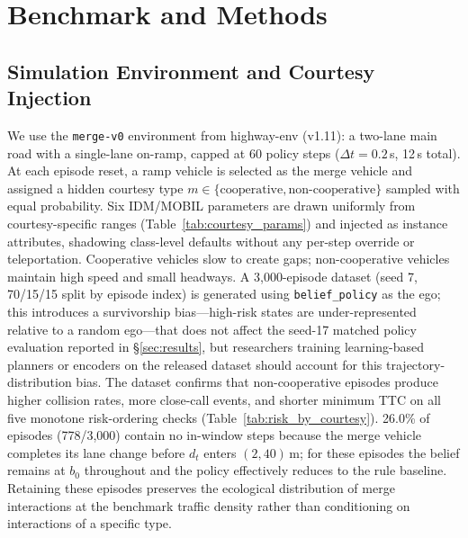 \section{Benchmark and Methods}
\label{sec:benchmark}

\subsection{Simulation Environment and Courtesy Injection}
We use the \texttt{merge-v0} environment from highway-env
\citep{leurent_highway_env} (v1.11): a two-lane main road with a single-lane
on-ramp, capped at 60 policy steps ($\Delta t{=}0.2$\,s, 12\,s total).
At each episode reset, a ramp vehicle is selected as the merge vehicle and
assigned a hidden courtesy type $m \in \{\text{cooperative},
\text{non-cooperative}\}$ sampled with equal probability.
Six IDM/MOBIL parameters are drawn uniformly from courtesy-specific ranges
(Table~\ref{tab:courtesy_params}) and injected as instance attributes,
shadowing class-level defaults without any per-step override or teleportation.
Cooperative vehicles slow to create gaps; non-cooperative vehicles maintain
high speed and small headways.
A 3{,}000-episode dataset (seed 7, 70/15/15 split by episode index) is
generated using \texttt{belief\_policy} as the ego; this introduces a survivorship bias---high-risk states are under-represented
relative to a random ego---that does not affect the seed-17 matched policy
evaluation reported in \S\ref{sec:results}, but researchers training
learning-based planners or encoders on the released dataset should account
for this trajectory-distribution bias.
The dataset confirms that non-cooperative episodes produce higher collision
rates, more close-call events, and shorter minimum TTC on all five monotone
risk-ordering checks (Table~\ref{tab:risk_by_courtesy}).
26.0\% of episodes (778/3{,}000) contain no in-window steps because the merge
vehicle completes its lane change before $d_t$ enters $(2,40)$\,m; for these
episodes the belief remains at $b_0$ throughout and the policy effectively
reduces to the rule baseline.
Retaining these episodes preserves the ecological distribution of merge
interactions at the benchmark traffic density rather than conditioning on
interactions of a specific type.

